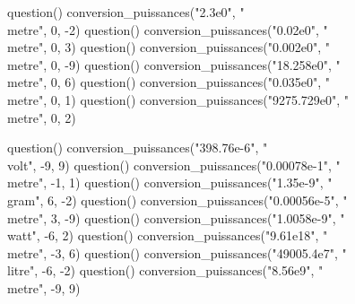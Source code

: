 \documentclass[../Cours.tex]{subfiles}
\begin{document}
\begin{questions}
    \begin{luacode}
        question() conversion_puissances("2.3e0", "\\metre", 0, -2)
        question() conversion_puissances("0.02e0", "\\metre", 0, 3)
        question() conversion_puissances("0.002e0", "\\metre", 0, -9)
        question() conversion_puissances("18.258e0", "\\metre", 0, 6)
        question() conversion_puissances("0.035e0", "\\metre", 0, 1)
        question() conversion_puissances("9275.729e0", "\\metre", 0, 2)
    \end{luacode}
    
    \begin{luacode}
        question() conversion_puissances("398.76e-6", "\\volt", -9, 9)
        question() conversion_puissances("0.00078e-1", "\\metre", -1, 1)
        question() conversion_puissances("1.35e-9", "\\gram", 6, -2)
        question() conversion_puissances("0.00056e-5", "\\metre", 3, -9)
        question() conversion_puissances("1.0058e-9", "\\watt", -6, 2)
        question() conversion_puissances("9.61e18", "\\metre", -3, 6)
        question() conversion_puissances("49005.4e7", "\\litre", -6, -2)
        question() conversion_puissances("8.56e9", "\\metre", -9, 9) 
    \end{luacode}


\end{questions}
\end{document}
